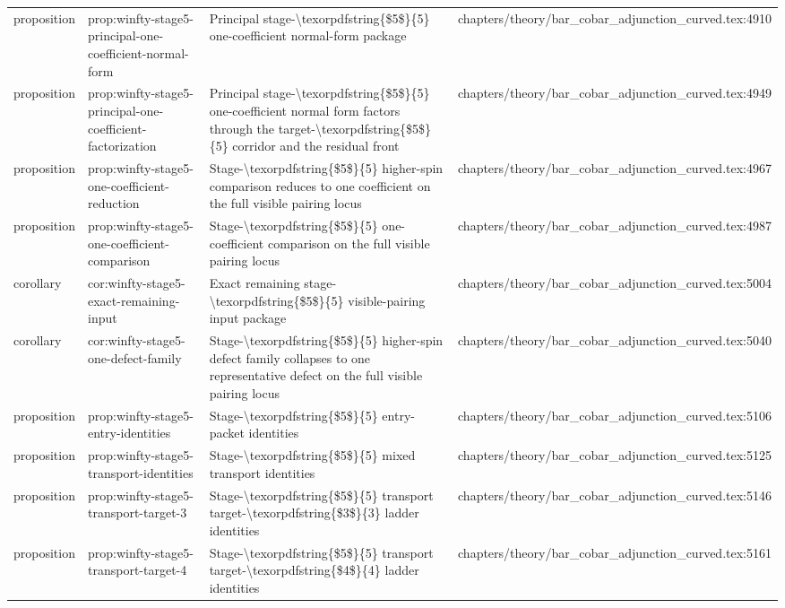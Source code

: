 \documentclass[11pt]{article}
\begin{document}
\begin{longtable}{L{0.10\textwidth}L{0.26\textwidth}L{0.42\textwidth}L{0.22\textwidth}}
proposition & prop:winfty-stage5-principal-one-coefficient-normal-form & Principal stage-\textbackslash{}texorpdfstring\{\$5\$\}\{5\} one-coefficient normal-form package & chapters/theory/bar\_cobar\_adjunction\_curved.tex:4910\\
proposition & prop:winfty-stage5-principal-one-coefficient-factorization & Principal stage-\textbackslash{}texorpdfstring\{\$5\$\}\{5\} one-coefficient normal form factors through the target-\textbackslash{}texorpdfstring\{\$5\$\}\{5\} corridor and the residual front & chapters/theory/bar\_cobar\_adjunction\_curved.tex:4949\\
proposition & prop:winfty-stage5-one-coefficient-reduction & Stage-\textbackslash{}texorpdfstring\{\$5\$\}\{5\} higher-spin comparison reduces to one coefficient on the full visible pairing locus & chapters/theory/bar\_cobar\_adjunction\_curved.tex:4967\\
proposition & prop:winfty-stage5-one-coefficient-comparison & Stage-\textbackslash{}texorpdfstring\{\$5\$\}\{5\} one-coefficient comparison on the full visible pairing locus & chapters/theory/bar\_cobar\_adjunction\_curved.tex:4987\\
corollary & cor:winfty-stage5-exact-remaining-input & Exact remaining stage-\textbackslash{}texorpdfstring\{\$5\$\}\{5\} visible-pairing input package & chapters/theory/bar\_cobar\_adjunction\_curved.tex:5004\\
corollary & cor:winfty-stage5-one-defect-family & Stage-\textbackslash{}texorpdfstring\{\$5\$\}\{5\} higher-spin defect family collapses to one representative defect on the full visible pairing locus & chapters/theory/bar\_cobar\_adjunction\_curved.tex:5040\\
proposition & prop:winfty-stage5-entry-identities & Stage-\textbackslash{}texorpdfstring\{\$5\$\}\{5\} entry-packet identities & chapters/theory/bar\_cobar\_adjunction\_curved.tex:5106\\
proposition & prop:winfty-stage5-transport-identities & Stage-\textbackslash{}texorpdfstring\{\$5\$\}\{5\} mixed transport identities & chapters/theory/bar\_cobar\_adjunction\_curved.tex:5125\\
proposition & prop:winfty-stage5-transport-target-3 & Stage-\textbackslash{}texorpdfstring\{\$5\$\}\{5\} transport target-\textbackslash{}texorpdfstring\{\$3\$\}\{3\} ladder identities & chapters/theory/bar\_cobar\_adjunction\_curved.tex:5146\\
proposition & prop:winfty-stage5-transport-target-4 & Stage-\textbackslash{}texorpdfstring\{\$5\$\}\{5\} transport target-\textbackslash{}texorpdfstring\{\$4\$\}\{4\} ladder identities & chapters/theory/bar\_cobar\_adjunction\_curved.tex:5161\\

\end{longtable}
\end{document}

